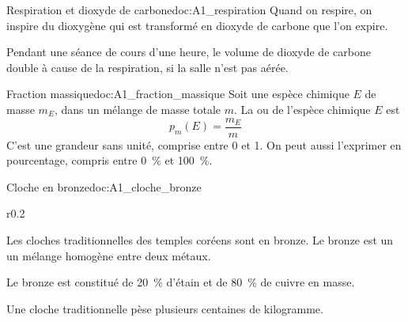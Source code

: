 
\begin{doc}{Respiration et dioxyde de carbone}{doc:A1_respiration}
  Quand on respire, on inspire du dioxygène  qui est transformé en dioxyde de carbone  que l'on expire.

  Pendant une séance de cours d'une heure, le volume de dioxyde de carbone  double à cause de la respiration, si la salle n'est pas aérée.
\end{doc}



\begin{doc}{Fraction massique}{doc:A1_fraction_massique}
  Soit une espèce chimique $E$ de masse $m_E$, dans un mélange de masse totale $m$.
  La  ou  de l'espèce chimique $E$ est
  \begin{equation*}
    p_{m}(E) = \frac{m_E}{m}
  \end{equation*}
  C'est une grandeur sans unité, comprise entre 0 et 1.
  On peut aussi l'exprimer en pourcentage, compris entre \qty{0}{\percent} et \qty{100}{\percent}.
\end{doc}

\begin{doc}{Cloche en bronze}{doc:A1_cloche_bronze}
  \begin{wrapfigure}[5]{r}{0.2\linewidth}
    \vspace*{-31pt}
    \centering
  \end{wrapfigure}
  
  Les cloches traditionnelles des temples coréens sont en bronze.
  Le bronze est un  un mélange homogène entre deux métaux.
  
  Le bronze est constitué de \qty{20}{\percent} d'étain  et de \qty{80}{\percent} de cuivre  en masse.

  Une cloche traditionnelle pèse plusieurs centaines de kilogramme.
\end{doc}


